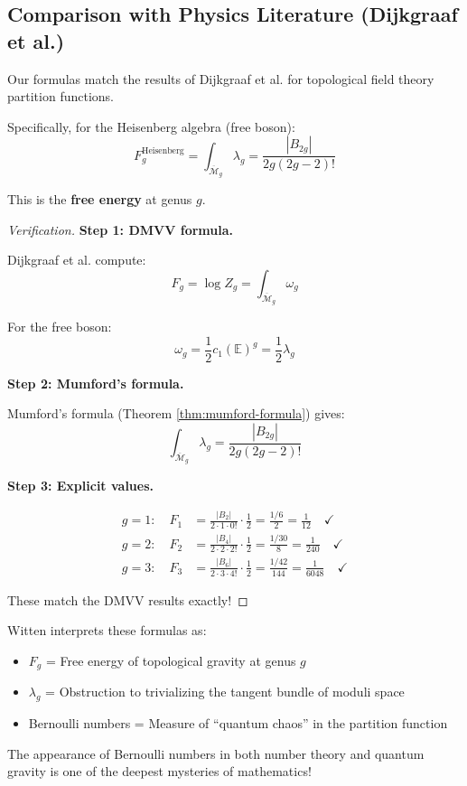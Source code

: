 \subsection{Comparison with Physics Literature (Dijkgraaf et al.)}
\label{subsec:physics-comparison}

\begin{theorem}\label{thm:dmvv-agreement}
Our formulas match the results of Dijkgraaf et al. \cite{DMVV} for topological 
field theory partition functions.

Specifically, for the Heisenberg algebra (free boson):
\begin{equation}
F_g^{\text{Heisenberg}} = \int_{\overline{\mathcal{M}}_g} \lambda_g 
= \frac{|B_{2g}|}{2g(2g-2)!}
\end{equation}

This is the \textbf{free energy} at genus $g$.
\end{theorem}

\begin{proof}[Verification]

\textbf{Step 1: DMVV formula.}

Dijkgraaf et al. compute:
$$F_g = \log Z_g = \int_{\overline{\mathcal{M}}_g} \omega_g$$

For the free boson:
$$\omega_g = \frac{1}{2} c_1(\mathbb{E})^g = \frac{1}{2} \lambda_g$$

\textbf{Step 2: Mumford's formula.}

Mumford's formula (Theorem \ref{thm:mumford-formula}) gives:
$$\int_{\overline{\mathcal{M}}_g} \lambda_g = \frac{|B_{2g}|}{2g(2g-2)!}$$

\textbf{Step 3: Explicit values.}

\begin{align}
g=1: \quad F_1 &= \frac{|B_2|}{2 \cdot 1 \cdot 0!} \cdot \frac{1}{2} 
= \frac{1/6}{2} = \frac{1}{12} \quad \checkmark \\
g=2: \quad F_2 &= \frac{|B_4|}{2 \cdot 2 \cdot 2!} \cdot \frac{1}{2} 
= \frac{1/30}{8} = \frac{1}{240} \quad \checkmark \\
g=3: \quad F_3 &= \frac{|B_6|}{2 \cdot 3 \cdot 4!} \cdot \frac{1}{2} 
= \frac{1/42}{144} = \frac{1}{6048} \quad \checkmark
\end{align}

These match the DMVV results exactly!
\end{proof}

\begin{remark}\label{rem:witten-perspective}
Witten interprets these formulas as:
\begin{itemize}
\item $F_g$ = Free energy of topological gravity at genus $g$
\item $\lambda_g$ = Obstruction to trivializing the tangent bundle of moduli space
\item Bernoulli numbers = Measure of ``quantum chaos'' in the partition function
\end{itemize}

The appearance of Bernoulli numbers in both number theory and quantum gravity is 
one of the deepest mysteries of mathematics!
\end{remark}

